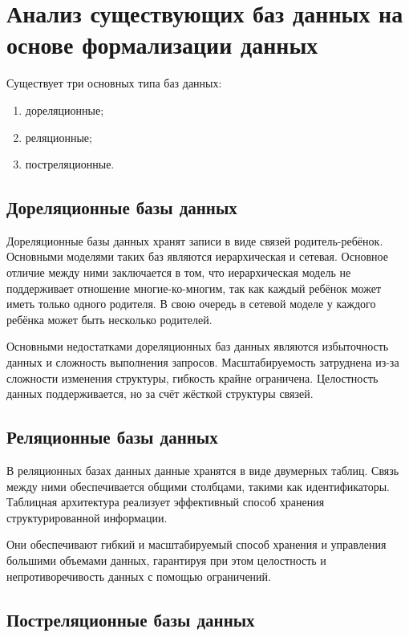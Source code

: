 \section{Анализ существующих баз данных на основе формализации данных}

Существует три основных типа баз данных: 
\begin{enumerate}
	\item дореляционные;
	\item реляционные;
	\item постреляционные.
\end{enumerate}

\subsection{Дореляционные базы данных}

Дореляционные базы данных \cite{DBModels} хранят записи в виде связей родитель-ребёнок. Основными моделями таких 
баз являются иерархическая и сетевая. Основное отличие между ними заключается в том, что иерархическая модель не поддерживает 
отношение многие-ко-многим, так как каждый ребёнок может иметь только одного родителя. 
В свою очередь в сетевой моделе у каждого ребёнка может быть несколько родителей.

Основными недостатками дореляционных баз данных являются избыточность данных и сложность выполнения запросов.
Масштабируемость затруднена из-за сложности изменения структуры, гибкость крайне ограничена. Целостность данных поддерживается, 
но за счёт жёсткой структуры связей.

\subsection{Реляционные базы данных}

В реляционных базах данных данные хранятся в виде двумерных таблиц. Связь между ними обеспечивается общими столбцами, такими как 
идентификаторы. Таблицная архитектура реализует эффективный способ хранения структурированной информации.

Они обеспечивают гибкий и масштабируемый способ хранения и управления большими объемами данных, 
гарантируя при этом целостность и непротиворечивость данных с помощью ограничений.

\subsection{Постреляционные базы данных}

